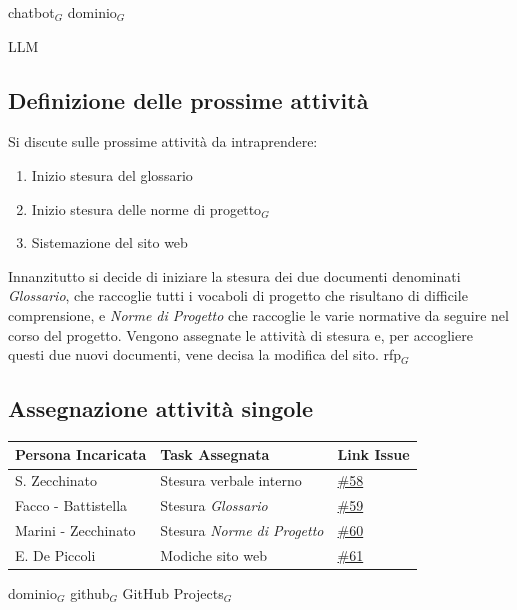\documentclass[a4paper, 10pt, colorlinks=true, linkcolor=black, urlcolor=blue, citecolor=blue, hidelinks]{article}
\newcommand{\issue}[1]{\href{https://github.com/thebitless-group-swe/thebitless.github.io/issues/#1}{\##1}}
\begin{document}
chatbot$_G$  dominio$_G$

LLM

\subsection{Definizione delle prossime attività}
Si discute sulle prossime attività da intraprendere:
\begin{enumerate}
    \item Inizio stesura del glossario
    \item Inizio stesura delle norme di progetto$_G$
    \item Sistemazione del sito web
\end{enumerate}
Innanzitutto si decide di iniziare la stesura dei due documenti denominati \textit{Glossario}, che raccoglie tutti i vocaboli di progetto che risultano di difficile comprensione, e \textit{Norme di Progetto} che raccoglie le varie normative da seguire nel corso del progetto.
Vengono assegnate le attività di stesura e, per accogliere questi due nuovi documenti, vene decisa la modifica del sito.
rfp$_G$
\subsection{Assegnazione attività singole}
\begin{center}
    \renewcommand{\arraystretch}{1.4}
        \begin{tabular}{|p{4.2cm}|p{6.2cm}|p{2.2cm}|}
        \hline
        \textbf{Persona Incaricata} & \textbf{Task Assegnata} & \centering\textbf{Link Issue} \tabularnewline
        \hline
        S. Zecchinato & Stesura verbale interno & \issue{58} \\
        \hline
        Facco - Battistella & Stesura \textit{Glossario} & \issue{59} \\
        \hline
        Marini - Zecchinato & Stesura \textit{Norme di Progetto} & \issue{60} \\
        \hline
        E. De Piccoli & Modiche sito web & \issue{61} \\
        \hline
    \end{tabular}
\end{center}

dominio$_G$ 
github$_G$
GitHub Projects$_G$
\appendix
\end{document}
